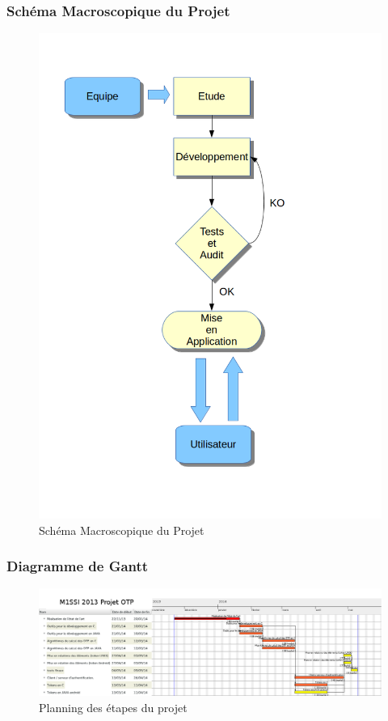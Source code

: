 \documentclass[xcolor=table]{beamer}
\begin{document}
\begin{frame}
\frametitle{Schéma Macroscopique du Projet}
\begin{figure}[h]
  \centering
  \includegraphics[scale=0.2]{../graphics/diagramme1.png}
  \caption{Schéma Macroscopique du Projet}
  \setlength{\parindent}{1cm}
\end{figure}
\end{frame}

\begin{frame}
\frametitle{Diagramme de Gantt}
  \begin{figure}
    \includegraphics[scale=0.22]{img/gantt.png} %
    \caption{Planning des étapes du projet}
  \end{figure}
\end{frame}
\end{document}
